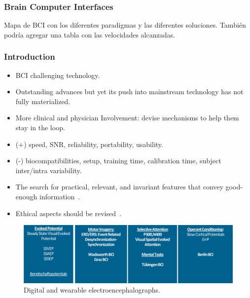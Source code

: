 \documentclass[aspectratio=169]{beamer}
\begin{document}
\begin{frame}
\frametitle{Brain Computer Interfaces}
\begin{center}
Mapa de BCI con los diferentes paradigmas y las diferentes soluciones.  También podría agregar una tabla con las velocidades alcanzadas.
\end{center}
\end{frame}

    \begin{frame}
        \frametitle{Introduction}
        \begin{center}
            \begin{itemize}
                \item BCI challenging technology.
                \item Outstanding advances but yet its push into mainstream technology has not fully materialized.
                \item More clinical and physician Involvement: devise mechanisms to help them stay in the loop.
                \item (+) speed, SNR, reliability, portability, usability.
                \item (-)  biocompatibilities, setup, training time, calibration time, subject inter/intra variability.
                \item The search for practical, relevant, and invariant features that convey good-enough information~\cite{Perdikis2014}.
                \item Ethical aspects should be revised~\cite{Yuste2017}.
            \end{itemize}
        \end{center}
    \end{frame}

\begin{frame}   
\begin{figure}[]
\centering
\includegraphics[scale=0.5]{images/BCIParadigms.png}
\caption[Wearable portable Digital Electroencephalograph]{Digital and wearable electroencephalographs.}
\label{fig:digitalelectroencephalograph}
\end{figure}
\end{frame}    
    
\end{document}
